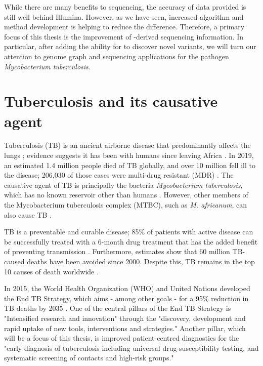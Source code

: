 \hspace{0.75cm}

\noindent
While there are many benefits to \ont{} sequencing, the accuracy of data provided is still well behind Illumina. However, as we have seen, increased algorithm and method development is helping to reduce the difference. Therefore, a primary focus of this thesis is the improvement of \ont{}-derived sequencing information. In particular, after adding the ability for \pandora{} to discover novel variants, we will turn our attention to genome graph and \ont{} sequencing applications for the pathogen \textit{Mycobacterium tuberculosis}.

\section{Tuberculosis and its causative agent}

Tuberculosis (TB) is an ancient airborne disease that predominantly affects the lungs \cite{Pai2016}; evidence suggests it has been with humans since leaving Africa \cite{Wirth2008,Comas2013}. In 2019, an estimated 1.4 million people died of TB globally, and over 10 million fell ill to the disease; 206,030 of those cases were multi-drug resistant (MDR) \cite{who2020}. The causative agent of TB is principally the bacteria \textit{Mycobacterium tuberculosis}, which has no known reservoir other than humans \cite{Comas2013}. However, other members of the Mycobacterium tuberculosis complex (MTBC), such as \textit{M. africanum}, can also cause TB \cite{Pai2016}. 

TB is a preventable and curable disease; 85\% of patients with active disease can be successfully treated with a 6-month drug treatment that has the added benefit of preventing transmission \cite{who2020}. Furthermore, estimates show that 60 million TB-caused deaths have been avoided since 2000. Despite this, TB remains in the top 10 causes of death worldwide \cite{who2020}. 

In 2015, the World Health Organization (WHO) and United Nations developed the End TB Strategy, which aims - among other goals - for a 95\% reduction in TB deaths by 2035 \cite{endtb2020}. One of the central pillars of the End TB Strategy is "Intensified research and innovation" through the "discovery, development and rapid uptake of new tools, interventions and strategies." Another pillar, which will be a focus of this thesis, is improved patient-centred diagnostics for the "early diagnosis of tuberculosis including universal drug-susceptibility testing, and systematic screening of contacts and high-risk groups."

